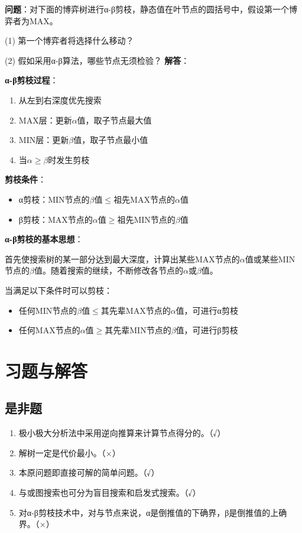 \begin{examplebox}[例题4.7 α-β剪枝]
\textbf{问题}：对下面的博弈树进行α-β剪枝，静态值在叶节点的圆括号中，假设第一个博弈者为MAX。

(1) 第一个博弈者将选择什么移动？

(2) 假如采用α-β算法，哪些节点无须检验？
\tcblower
\textbf{解答}：

\textbf{α-β剪枝过程}：
\begin{enumerate}[itemsep=0pt]
    \item 从左到右深度优先搜索
    \item MAX层：更新$\alpha$值，取子节点最大值
    \item MIN层：更新$\beta$值，取子节点最小值
    \item 当$\alpha \geq \beta$时发生剪枝
\end{enumerate}

\textbf{剪枝条件}：
\begin{itemize}[itemsep=0pt]
    \item α剪枝：MIN节点的$\beta$值$\leq$祖先MAX节点的$\alpha$值
    \item β剪枝：MAX节点的$\alpha$值$\geq$祖先MIN节点的$\beta$值
\end{itemize}
\end{examplebox}

\begin{notebox}
\textbf{α-β剪枝的基本思想}：

首先使搜索树的某一部分达到最大深度，计算出某些MAX节点的$\alpha$值或某些MIN节点的$\beta$值。随着搜索的继续，不断修改各节点的$\alpha$或$\beta$值。

当满足以下条件时可以剪枝：
\begin{itemize}[itemsep=0pt]
    \item 任何MIN节点的$\beta$值$\leq$其先辈MAX节点的$\alpha$值，可进行α剪枝
    \item 任何MAX节点的$\alpha$值$\geq$其先辈MIN节点的$\beta$值，可进行β剪枝
\end{itemize}
\end{notebox}

\section{习题与解答}

\subsection{是非题}

\begin{enumerate}[leftmargin=2em,itemsep=2pt]
    \item 极小极大分析法中采用逆向推算来计算节点得分的。（√）
    \item 解树一定是代价最小。（×）
    \item 本原问题即直接可解的简单问题。（√）
    \item 与或图搜索也可分为盲目搜索和启发式搜索。（√）
    \item 对α-β剪枝技术中，对与节点来说，α是倒推值的下确界，β是倒推值的上确界。（×）
\end{enumerate}

